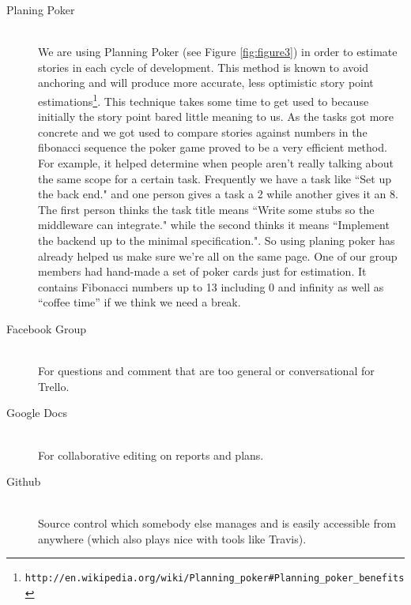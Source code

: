 \documentclass[11pt, a4paper]{article}
\begin{document}
\begin{description}
  \item[Planing Poker] \hfill \\
We are using Planning Poker (see Figure \ref{fig:figure3}) in order to estimate stories in each cycle of development. This method is known to avoid anchoring and will produce more accurate, less optimistic story point estimations\footnote{\tt{http://en.wikipedia.org/wiki/Planning\_poker\#Planning\_poker\_benefits}}. This technique takes some time to get used to because initially the story point bared little meaning to us. As the tasks got more concrete and we got used to compare stories against numbers in the fibonacci sequence the poker game proved to be a very efficient method. 
For example, it helped determine when people aren't really talking about the same scope for a certain task. Frequently we have a task like ``Set up the back end." and one person gives a task a 2 while another gives it an 8. The first person thinks the task title means ``Write some stubs so the middleware can integrate." while the second thinks it means ``Implement the backend up to the minimal specification.". So using planing poker has already helped us make sure we're all on the same page. One of our group members had hand-made a set of poker cards just for estimation. It contains Fibonacci numbers up to 13 including 0 and infinity as well as ``coffee time'' if we think we need a break. 

  \item[Facebook Group] \hfill \\
  For questions and comment that are too general or conversational for Trello.
  \item[Google Docs] \hfill \\
  For collaborative editing on reports and plans.
  \item[Github] \hfill \\
  Source control which somebody else manages and is easily accessible from anywhere
  (which also plays nice with tools like Travis).



\end{description}
\end{document}
